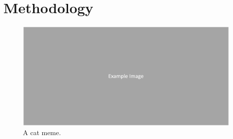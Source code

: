 \chapter{Methodology}

\begin{figure}[H]
    \centering
    \includegraphics[width=1\linewidth]{figures/img.png}
    \caption{A cat meme.}
    \label{fig:overall_framework}
\end{figure}